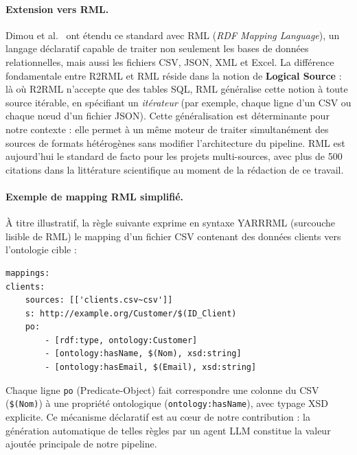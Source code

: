 \paragraph{Extension vers RML.}
Dimou et al.~\cite{dimou2014rml} ont étendu ce standard avec
RML (\textit{RDF Mapping Language}), un langage déclaratif capable
de traiter non seulement les bases de données relationnelles, mais
aussi les fichiers CSV, JSON, XML et Excel.
La différence fondamentale entre R2RML et RML réside dans la notion
de \textbf{Logical Source} : là où R2RML n'accepte que des tables SQL,
RML généralise cette notion à toute source itérable, en spécifiant
un \textit{itérateur} (par exemple, chaque ligne d'un CSV ou chaque
nœud d'un fichier JSON).
Cette généralisation est déterminante pour notre contexte :
elle permet à un même moteur de traiter simultanément des sources
de formats hétérogènes sans modifier l'architecture du pipeline.
RML est aujourd'hui le standard de facto pour les projets
multi-sources, avec plus de 500 citations dans la littérature
scientifique au moment de la rédaction de ce travail.

\paragraph{Exemple de mapping RML simplifié.}
À titre illustratif, la règle suivante exprime en syntaxe YARRRML
(surcouche lisible de RML) le mapping d'un fichier CSV contenant
des données clients vers l'ontologie cible :
\begin{verbatim}
mappings:
clients:
    sources: [['clients.csv~csv']]
    s: http://example.org/Customer/$(ID_Client)
    po:
        - [rdf:type, ontology:Customer]
        - [ontology:hasName, $(Nom), xsd:string]
        - [ontology:hasEmail, $(Email), xsd:string]
\end{verbatim}

Chaque ligne \texttt{po} (Predicate-Object) fait correspondre
une colonne du CSV (\texttt{\$(Nom)}) à une propriété ontologique
(\texttt{ontology:hasName}), avec typage XSD explicite.
Ce mécanisme déclaratif est au cœur de notre contribution :
la génération automatique de telles règles par un agent LLM
constitue la valeur ajoutée principale de notre pipeline.

